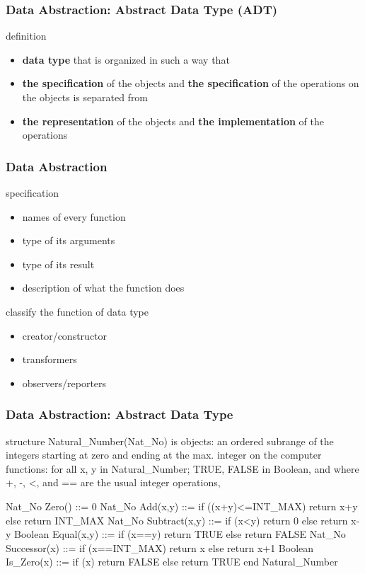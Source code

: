 \documentclass[newPxFont,sthlmFooter,nooffset]{beamer}
\begin{document}
\begin{frame}[t]
  \frametitle{Data Abstraction: Abstract Data Type (ADT)}
definition
\begin{itemize}
\item \textbf{data type} that is organized in such a way that
\item \textbf{the specification} of the objects and \textbf{the specification} of the operations on the objects is separated from
\item  \textbf{the representation} of the objects and \textbf{the implementation} of the operations
\end{itemize}


\end{frame}

\begin{frame}[t]
  \frametitle{Data Abstraction}
specification
\begin{itemize}
\item  names of every function
\item type of its arguments
\item type of its result
\item description of what the function does
\end{itemize}

classify the function of data type 
\begin{itemize}
\item creator/constructor
\item transformers
\item observers/reporters
\end{itemize}

\end{frame}

\begin{frame}[t, fragile]
  \frametitle{Data Abstraction: Abstract Data Type}
\begin{codedefnb}
structure Natural_Number(Nat_No) is
   objects: an ordered subrange of the integers 
            starting at zero and ending at the max. 
            integer on the computer 
   functions: for all x, y in Natural_Number; 
            TRUE, FALSE in Boolean, 
            and where +, -, <, and == are 
            the usual integer operations,

   Nat_No Zero() ::= 0
   Nat_No Add(x,y) ::= if ((x+y)<=INT_MAX) return x+y
      else return INT_MAX 
   Nat_No Subtract(x,y) ::= if (x<y) return 0
      else return x-y 
   Boolean Equal(x,y) ::= if (x==y) return TRUE
      else return FALSE 
   Nat_No Successor(x) ::= if (x==INT_MAX) return x
      else return x+1 
   Boolean Is_Zero(x) ::= if (x) return FALSE
      else return TRUE
end Natural_Number
\end{codedefnb}
\end{frame}
\end{document}
